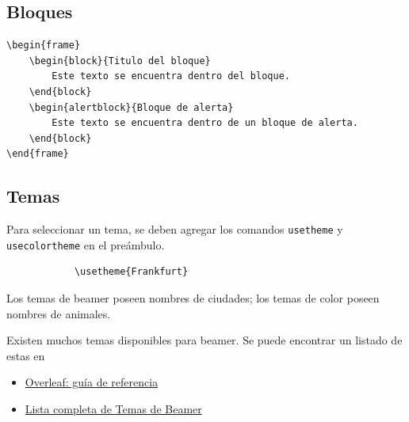\documentclass[../notes.tex]{subfiles}
\begin{document}
    \subsection{Bloques}
        \begin{verbatim}
\begin{frame}
    \begin{block}{Titulo del bloque}
        Este texto se encuentra dentro del bloque.
    \end{block}
    \begin{alertblock}{Bloque de alerta}
        Este texto se encuentra dentro de un bloque de alerta.
    \end{block}
\end{frame}
        \end{verbatim}
    
    \subsection{Temas}
        Para seleccionar un tema, se deben agregar los comandos \texttt{usetheme} y \texttt{usecolortheme} en el preámbulo.
        \begin{verbatim}
        	\usetheme{Frankfurt}
        \end{verbatim}
        
        	Los temas de beamer poseen nombres de ciudades; los temas de color poseen nombres de animales.

        Existen muchos temas disponibles para beamer. Se puede encontrar un listado de estas en
            \begin{itemize}
            	\item \href{https://www.overleaf.com/learn/latex/Beamer%23Creating_a_table_of_contents#Reference_guide}{Overleaf: guía de referencia}
            	\item \href{https://latex-beamer.com/tutorials/beamer-themes/}{Lista completa de Temas de Beamer}
            \end{itemize}
\end{document}
